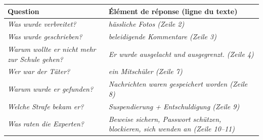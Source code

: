 \documentclass[11pt]{article}
\newcommand{\all}[1]{\ifmmode\text{\textit{#1}}\else\begingroup\selectlanguage{ngerman}\itshape #1\endgroup\fi}
\begin{document}
\begin{center}
\begin{tabularx}{\linewidth}{|X|X|}
\hline
\rowcolor{popblueL} \textbf{Question} & \textbf{Élément de réponse (ligne du texte)} \\
\hline
\all{Was wurde verbreitet?} & \all{hässliche Fotos} (Zeile 2) \\
\hline
\all{Was wurde geschrieben?} & \all{beleidigende Kommentare} (Zeile 3) \\
\hline
\all{Warum wollte er nicht mehr zur Schule gehen?} & \all{Er wurde ausgelacht und ausgegrenzt.} (Zeile 4) \\
\hline
\all{Wer war der Täter?} & \all{ein Mitschüler} (Zeile 7) \\
\hline
\all{Warum wurde er gefunden?} & \all{Nachrichten waren gespeichert worden} (Zeile 8) \\
\hline
\all{Welche Strafe bekam er?} & \all{Suspendierung + Entschuldigung} (Zeile 9) \\
\hline
\all{Was raten die Experten?} & \all{Beweise sichern, Passwort schützen, blockieren, sich wenden an} (Zeile 10--11) \\
\hline
\end{tabularx}
\end{center}
\end{document}
